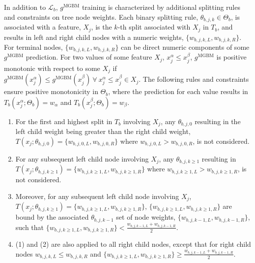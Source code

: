 \documentclass[information,article,submit,moreauthors,pdftex]{definitions/mdpi}
\begin{document}
\noindent In addition to $\mathcal{L}_{b}$, $g^\text{MGBM}$ training is characterized by additional splitting rules and constraints on tree node weights. Each binary splitting rule, $\theta_{b,j,k} \in \Theta_b$, is associated with a feature, $X_j$, is the $k$-th split associated with $X_j$ in $T_b$, and results in left and right child nodes with a numeric weights, $\{w_{b,j,k,L}, w_{b,j,k,R}\}$. For terminal nodes, $\{w_{b,j,k,L}, w_{b,j,k,R}\}$ can be direct numeric components of some $g^\text{MGBM}$ prediction. For two values of some feature $X_j$, $x^{\alpha}_j \le x^{\beta}_j$, $g^{\text{MGBM}}$ is positive monotonic with respect to some $X_j$ if $g^{\text{MGBM}}(x^{\alpha}_j) \le g^{\text{MGBM}}(x^{\beta}_j) ~\forall ~x^{\alpha}_j \le x^{\beta}_j \in X_j$. The following rules and constraints ensure positive monotonicity in $\Theta_b$, where the prediction for each value results in $T_b(x^{\alpha}_j; \Theta_b) = w_\alpha$ and $T_b(x^{\beta}_j; \Theta_b) = w_\beta$.

\begin{enumerate}[leftmargin=*,labelsep=4.9mm]
\item For the first and highest split in $T_b$ involving $X_j$, any $\theta_{b,j,0}$ resulting in the left child weight being greater than the right child weight, $T(x_j; \theta_{b,j,0}) = \{w_{b,j,0,L}, w_{b,j,0,R}\}$ where $w_{b,j,0,L} > w_{b,j,0,R}$, is not considered. 
\item For any subsequent left child node involving $X_j$, any $\theta_{b,j, k\ge1}$ resulting in $T(x_j; \theta_{b,j,k\ge1}) = \{w_{b,j,k\ge1,L}, w_{b,j,k\ge1,R}\}$ where $w_{b,j,k\ge1,L} > w_{b,j,k\ge1,R}$, is not considered.
\item Moreover, for any subsequent left child node involving $X_j$, $T(x_j; \theta_{b,j,k\ge1}) = \{w_{b,j,k\ge1,L}, w_{b,j,k\ge1,R}\}$, $\{w_{b,j,k\ge1,L}, w_{b,j,k\ge1,R}\}$ are bound by the associated $\theta_{b,j,k-1}$ set of node weights, $\{w_{b,j,k-1,L}, w_{b,j,k-1, R}\}$, such that $ \{w_{b,j,k\ge1,L}, w_{b,j,k\ge1,R}\} < \frac{w_{b,j,k-1,L} + w_{b,j,k-1,R}}{2}$.
\item (1) and (2) are also applied to all right child nodes, except that for right child nodes $ w_{b,j,k,L} \le w_{b,j,k,R}$ and $\{w_{b,j,k\ge1,L}, w_{b,j,k\ge1,R}\} \ge \frac{w_{b,j,k-1,L} + w_{b,j,k-1,R}}{2}$.
\end{enumerate}
\end{document}
